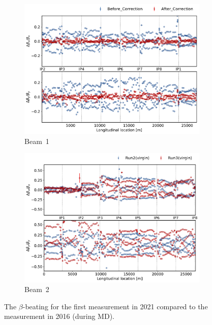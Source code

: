 \documentclass[a4paper]{cernatsnote}
\begin{document}
\begin{figure}[ht]
\begin{subfigure}{.5\textwidth}
  \centering
  \includegraphics[width=.8\linewidth]{plots/beam1/beta_beat_swapped_vs_2016.pdf}  
  \caption{Beam~1}
  \label{fig:sub-first}
\end{subfigure}
\begin{subfigure}{.5\textwidth}
  \centering
  \includegraphics[width=.8\linewidth]{plots/beam2/B2_BetaBeat_2016_vs_first2021.pdf}  
  \caption{Beam~2}
  \label{fig:sub-second}
\end{subfigure}
\caption{The $\beta$-beating for the first measurement in 2021 compared to the measurement in 2016 (during MD).}
\label{fig:initalVs2016}
\end{figure}
\end{document}
